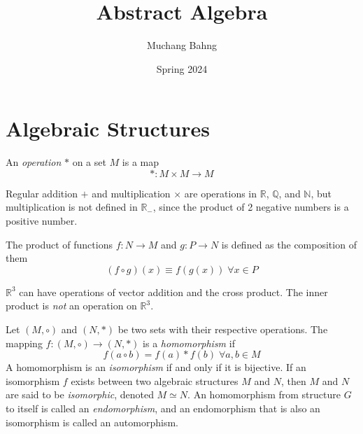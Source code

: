 \documentclass{article}
\begin{document}
\title{Abstract Algebra}
\author{Muchang Bahng}
\date{Spring 2024}

\maketitle
\tableofcontents
\pagebreak

\section{Algebraic Structures}

\begin{definition}
  An \textit{operation} $*$ on a set $M$ is a map 
  \begin{equation}
     \ast : M \times M \longrightarrow M
  \end{equation}
\end{definition}

\begin{example}
  Regular addition $+$ and multiplication $\times$ are operations in $\mathbb{R}$, $\mathbb{Q}$, and $\mathbb{N}$, but multiplication is not defined in $\mathbb{R_{-}}$, since the product of 2 negative numbers is a positive number. 
  \end{example}

\begin{example}
  The product of functions $f: N \longrightarrow M$ and $g: P \longrightarrow N$ is defined as the composition of them
  \begin{equation}
    (f \circ g)(x) \equiv f(g(x)) \; \forall x\in P
  \end{equation}
\end{example}

\begin{example}
  $\mathbb{R}^{3}$ can have operations of vector addition and the cross product. The inner product is \textit{not} an operation on $\mathbb{R}^3$.
\end{example}

\begin{definition}
  Let $(M, \circ)$ and $(N, *)$ be two sets with their respective operations. The mapping $f: (M, \circ) \longrightarrow (N, *)$ is a \textit{homomorphism} if
  \begin{equation}
    f(a \circ b) = f(a) * f(b) \; \forall a, b \in M
  \end{equation}
  A homomorphism is an \textit{isomorphism} if and only if it is bijective. If an isomorphism $f$ exists between two algebraic structures $M$ and $N$, then $M$ and $N$ are said to be \textit{isomorphic}, denoted $M \simeq N$. An homomorphism from structure $G$ to itself is called an \textit{endomorphism}, and an endomorphism that is also an isomorphism is called an automorphism. 
\end{definition}
\end{document}
